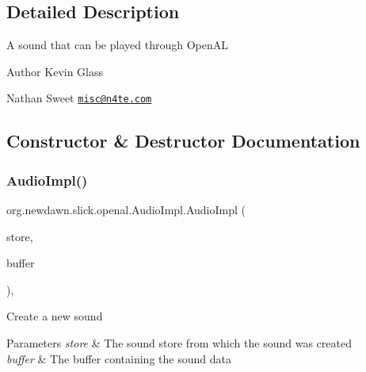 \subsection{Detailed Description}
A sound that can be played through Open\+AL

\begin{DoxyAuthor}{Author}
Kevin Glass 

Nathan Sweet \href{mailto:misc@n4te.com}{\tt misc@n4te.\+com} 
\end{DoxyAuthor}


\subsection{Constructor \& Destructor Documentation}
\mbox{\label{classorg_1_1newdawn_1_1slick_1_1openal_1_1_audio_impl_a2496a8ff7cccffb0da40014b24707ee0}} 
\subsubsection{\texorpdfstring{Audio\+Impl()}{AudioImpl()}\hspace{0.1cm}{\footnotesize\ttfamily [1/2]}}
{\footnotesize\ttfamily org.\+newdawn.\+slick.\+openal.\+Audio\+Impl.\+Audio\+Impl (\begin{DoxyParamCaption}\item[{\mbox{\hyperlink{classorg_1_1newdawn_1_1slick_1_1openal_1_1_sound_store}{Sound\+Store}}}]{store,  }\item[{int}]{buffer }\end{DoxyParamCaption})\hspace{0.3cm}{\ttfamily [inline]}, {\ttfamily [package]}}

Create a new sound


\begin{DoxyParams}{Parameters}
{\em store} & The sound store from which the sound was created \\
\hline
{\em buffer} & The buffer containing the sound data \\
\hline
\end{DoxyParams}

